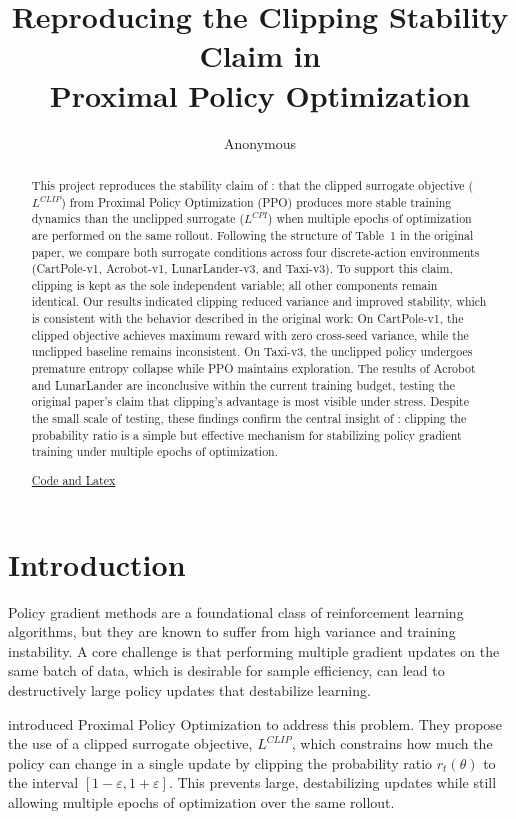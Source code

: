 \documentclass{article}
\title{Reproducing the Clipping Stability Claim in\\Proximal Policy Optimization}
\author{Anonymous}
\begin{document}
\maketitle

\begin{abstract}
This project reproduces the stability claim of \citep{schulman2017ppo}: that the clipped surrogate objective ($L^{CLIP}$) from Proximal Policy Optimization (PPO) produces more stable training dynamics than the unclipped surrogate ($L^{CPI}$) when multiple epochs of optimization are performed on the same rollout. Following the structure of Table~1 in the original paper, we compare both surrogate conditions across four discrete-action environments (CartPole-v1, Acrobot-v1, LunarLander-v3, and Taxi-v3). To support this claim, clipping is kept as the sole independent variable; all other components remain identical. Our results indicated clipping reduced variance and improved stability, which is consistent with the behavior described in the original work: On CartPole-v1, the clipped objective achieves maximum reward with zero cross-seed variance, while the unclipped baseline remains inconsistent. On Taxi-v3, the unclipped policy undergoes premature entropy collapse while PPO maintains exploration. The results of Acrobot and LunarLander are inconclusive within the current training budget, testing the original paper's claim that clipping's advantage is most visible under stress. Despite the small scale of testing, these findings confirm the central insight of \citep{schulman2017ppo}: clipping the probability ratio is a simple but effective mechanism for stabilizing policy gradient training under multiple epochs of optimization.

\href{https://github.com/morderbet/ECE570-Project-PPO-Reproduction}{Code and Latex}
\end{abstract}

\section{Introduction}

Policy gradient methods are a foundational class of reinforcement learning algorithms, but they are known to suffer from high variance and training instability. A core challenge is that performing multiple gradient updates on the same batch of data, which is desirable for sample efficiency, can lead to destructively large policy updates that destabilize learning.

\citet{schulman2017ppo} introduced Proximal Policy Optimization to address this problem. They propose the use of a clipped surrogate objective, $L^{CLIP}$, which constrains how much the policy can change in a single update by clipping the probability ratio $r_t(\theta)$ to the interval $[1-\varepsilon, 1+\varepsilon]$. This prevents large, destabilizing updates while still allowing multiple epochs of optimization over the same rollout.
\end{document}

